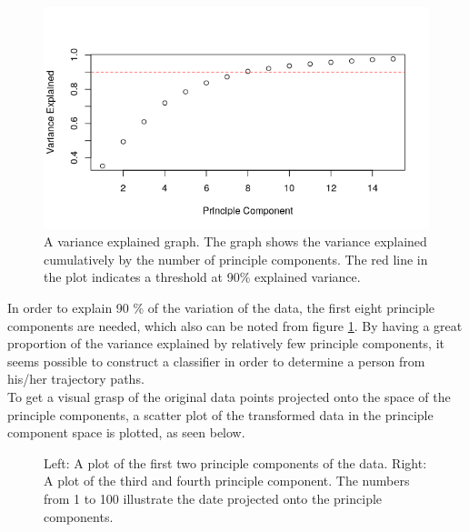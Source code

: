 \documentclass[11pt, fleqn, titlepage]{article}
\begin{document}
\begin{figure}[H]
	\centering
	\includegraphics[width=0.65\linewidth]{billeder/varexp.png}
	\caption{A variance explained graph. The graph shows the variance explained cumulatively by the number of principle components. The red line in the plot indicates a threshold at 90\% explained variance.}
	\label{fig:varexp}
\end{figure}
\noindent
In order to explain 90 \% of the variation of the data, the first eight principle components are needed, which also can be noted from figure \ref{fig:varexp}. By having a great proportion of the variance explained by relatively few principle components, it seems possible to construct a classifier in order to determine a person from his/her trajectory paths.
\\
To get a visual grasp of the original data points projected onto the space of the principle components, a scatter plot of the transformed data in the principle component space is plotted, as seen below.

\begin{figure}[H]
	\centering
	\qquad
	\caption{Left: A plot of the first two principle components of the data. Right: A plot of the third and fourth principle component. The numbers from 1 to 100 illustrate the date projected onto the principle components.}%
	\label{fig:example}%
\end{figure}
\newpage
\end{document}
